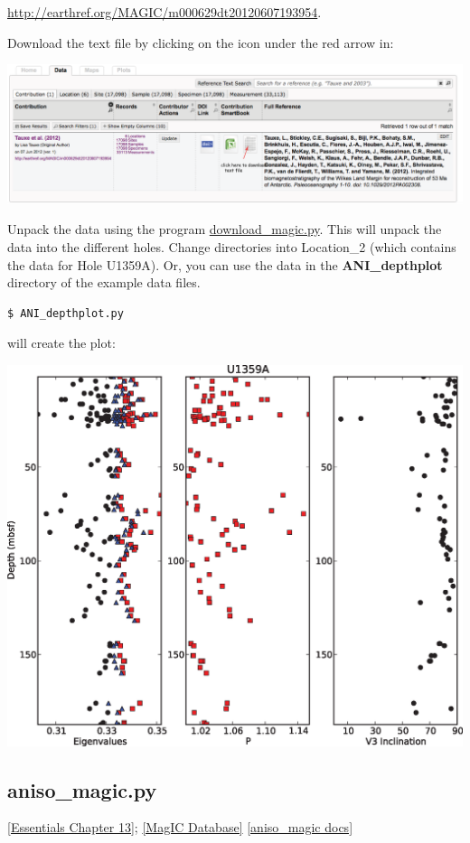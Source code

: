 \documentclass[11pt]{book}
\begin{document}
{\url{http://earthref.org/MAGIC/m000629dt20120607193954}.

Download the text file by clicking on the icon under the red arrow in:

  \includegraphics[width=15cm]{EPSfiles/tauxe12-magic.eps}

Unpack the data using the program \href{#download_magic.py}{download\_magic.py}.  This will unpack the data into the different holes.  Change directories into Location\_2 (which contains the data for Hole U1359A).  Or, you can use the data in the {\bf ANI\_depthplot} directory of the example data files.


\begin{verbatim}
$ ANI_depthplot.py
\end{verbatim}

\noindent will create the plot:

\includegraphics[width=15cm]{EPSfiles/ani-depthplot.eps}


\subsection{aniso\_magic.py}
\href{http://earthref.org/MAGIC/books/Tauxe/Essentials/WebBook3ch13.html#ch13}{[Essentials Chapter 13]};
\href{#MagICDatabase}{[MagIC Database]}
\href{https://github.com/PmagPy/PmagPy/blob/master/programs/aniso_magic.py}{[aniso\_magic docs]}

}
\end{document}

